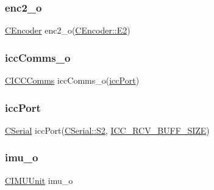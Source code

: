 \subsubsection{\texorpdfstring{enc2\+\_\+o}{enc2\_o}}
{\footnotesize\ttfamily \mbox{\hyperlink{class_c_encoder}{C\+Encoder}} enc2\+\_\+o(\mbox{\hyperlink{class_c_encoder_a49810cc352199fb02a60e2ef8ac6cbc3aaa314a69656e242defabd33eb8e90284}{C\+Encoder\+::\+E2}})}

\mbox{\label{_a_d_a_s___m_c_u_8ino_a62ef6b3308259edb69af585549178324}} 
\subsubsection{\texorpdfstring{icc\+Comms\+\_\+o}{iccComms\_o}}
{\footnotesize\ttfamily \mbox{\hyperlink{class_c_i_c_c_comms}{C\+I\+C\+C\+Comms}} icc\+Comms\+\_\+o(\mbox{\hyperlink{_a_d_a_s___m_c_u_8ino_ad1e6d9fed4369104e412a46c019634d2}{icc\+Port}})}

\mbox{\label{_a_d_a_s___m_c_u_8ino_ad1e6d9fed4369104e412a46c019634d2}} 
\subsubsection{\texorpdfstring{icc\+Port}{iccPort}}
{\footnotesize\ttfamily \mbox{\hyperlink{class_c_serial}{C\+Serial}} icc\+Port(\mbox{\hyperlink{class_c_serial_a000039540cc90b18bafacf5744e7eda2a8cc95f4591147b0df028e003f82220a1}{C\+Serial\+::\+S2}}, \mbox{\hyperlink{_a_d_a_s___cfg_8h_abf41bed56ee0b2a8858687c4420bb110}{I\+C\+C\+\_\+\+R\+C\+V\+\_\+\+B\+U\+F\+F\+\_\+\+S\+I\+ZE}})}

\mbox{\label{_a_d_a_s___m_c_u_8ino_ae51e36f83228f859afeb8a72e60339a6}} 
\subsubsection{\texorpdfstring{imu\+\_\+o}{imu\_o}}
{\footnotesize\ttfamily \mbox{\hyperlink{class_c_i_m_u_unit}{C\+I\+M\+U\+Unit}} imu\+\_\+o}



